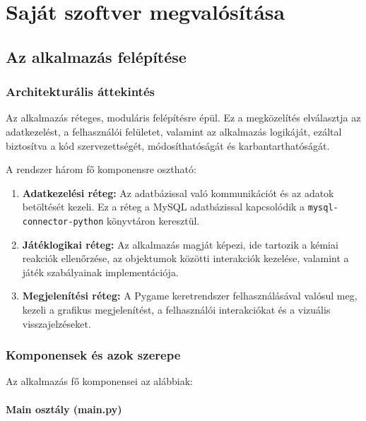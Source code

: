 \documentclass[]{thesis-ekf}
\begin{document}
	\chapter{Saját szoftver megvalósítása} 
	\section{Az alkalmazás felépítése}
	
	\subsection{Architekturális áttekintés}
	
	Az alkalmazás réteges, moduláris felépítésre épül. Ez a megközelítés elválasztja az adatkezelést, a felhasználói felületet, valamint az alkalmazás logikáját, ezáltal biztosítva a kód szervezettségét, módosíthatóságát és karbantarthatóságát.
	
	A rendszer három fő komponensre osztható:
	
	\begin{enumerate}
		\item \textbf{Adatkezelési réteg:} Az adatbázissal való kommunikációt és az adatok betöltését kezeli. Ez a réteg a MySQL adatbázissal kapcsolódik a \texttt{mysql-connector-python} könyvtáron keresztül.
		
		\item \textbf{Játéklogikai réteg:} Az alkalmazás magját képezi, ide tartozik a kémiai reakciók ellenőrzése, az objektumok közötti interakciók kezelése, valamint a játék szabályainak implementációja.
		
		\item \textbf{Megjelenítési réteg:} A Pygame keretrendszer felhasználásával valósul meg, kezeli a grafikus megjelenítést, a felhasználói interakciókat és a vizuális visszajelzéseket.
	\end{enumerate}
	
	\subsection{Komponensek és azok szerepe}
	
	Az alkalmazás fő komponensei az alábbiak:
	
	\subsubsection{Main osztály (main.py)}
	
\end{document}
